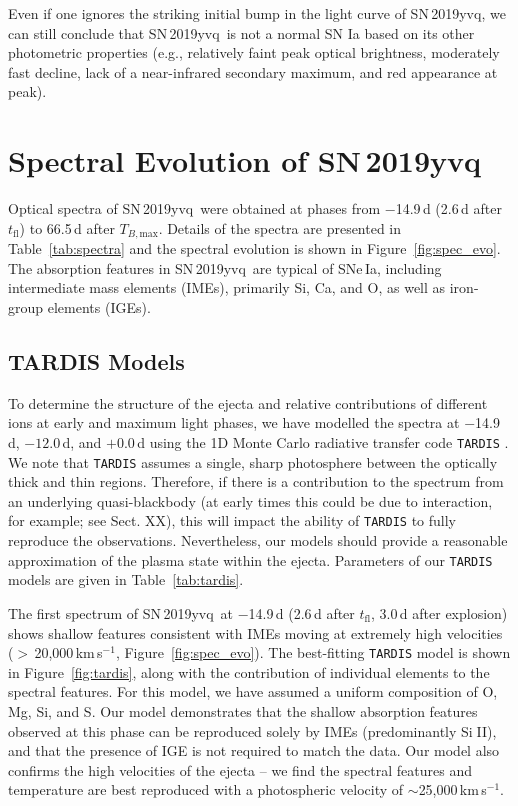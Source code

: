 \documentclass[twocolumn]{aastex63}
\def\ion#1#2{#1$\;${\footnotesize\rm{#2}}\relax}
\newcommand{\tfl}{$t_\mathrm{fl}$}
\newcommand{\tbmax}{$T_{B,\mathrm{max}}$}
\newcommand{\kms}{km\,s$^{-1}$}
\newcommand{\sn}{SN\,2019yvq}
\begin{document}
Even if one ignores the striking initial bump in the light curve of \sn, we
can still conclude that \sn\ is not a normal SN Ia based on its other
photometric properties (e.g., relatively faint peak optical brightness,
moderately fast decline, lack of a near-infrared secondary maximum, and red
appearance at peak).

\section{Spectral Evolution of \sn}\label{sec:spec}

Optical spectra of \sn\ were obtained at phases from $-$14.9\,d (2.6\,d after
\tfl) to 66.5\,d after \tbmax. Details of the spectra are presented in
Table~\ref{tab:spectra} and the spectral evolution is shown in
Figure~\ref{fig:spec_evo}. The absorption features in \sn\ are typical of
SNe\,Ia, including intermediate mass elements (IMEs), primarily Si, Ca, and O,
as well as iron-group elements (IGEs).

\subsection{TARDIS Models}\label{sec:tardis}

To determine the structure of the ejecta and relative contributions of
different ions at early and maximum light phases, we have modelled the spectra
at $-$14.9\,d, $-12.0$\,d, and $+$0.0\,d using the 1D Monte Carlo radiative
transfer code \texttt{TARDIS} \citep{Kerzendorf14}. We note that
\texttt{TARDIS} assumes a single, sharp photosphere between the optically
thick and thin regions. Therefore, if there is a contribution to the spectrum
from an underlying quasi-blackbody (at early times this could be due to
interaction, for example; see Sect. XX), this will impact the ability of
\texttt{TARDIS} to fully reproduce the observations. Nevertheless, our models
should provide a reasonable approximation of the plasma state within the
ejecta. Parameters of our \texttt{TARDIS} models are given in
Table~\ref{tab:tardis}.



The first spectrum of \sn\ at $-$14.9\,d (2.6\,d after \tfl, 3.0\,d after
explosion) shows shallow features consistent with IMEs moving at extremely
high velocities ($>$\,20,000\,\kms, Figure~\ref{fig:spec_evo}). The
best-fitting \texttt{TARDIS} model is shown in Figure~\ref{fig:tardis}, along
with the contribution of individual elements to the spectral features. For
this model, we have assumed a uniform composition of O, Mg, Si, and S. Our
model demonstrates that the shallow absorption features observed at this phase
can be reproduced solely by IMEs (predominantly \ion{Si}{II}), and that the
presence of IGE is not required to match the data. Our model also confirms the
high velocities of the ejecta -- we find the spectral features and temperature
are best reproduced with a photospheric velocity of
$\sim$25,000\,\kms.
\end{document}
